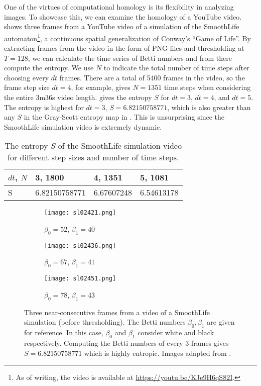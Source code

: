 One of the virtues of computational homology is its flexibility in analyzing images. To showcase this, we can examine the homology of a YouTube video.  shows three frames from a YouTube video of a simulation of the SmoothLife automaton\footnote{As of writing, the video is available at \url{https://youtu.be/KJe9H6qS82I}.}, a continuous spatial generalization of Conway's ``Game of Life''. By extracting frames from the video in the form of PNG files and thresholding at $T = 128$, we can calculate the time series of Betti numbers and from there compute the entropy. We use $N$ to indicate the total number of time steps after choosing every $dt$ frames. There are a total of 5400 frames in the video, so the frame step size $dt = 4$, for example, gives $N = 1351$ time steps when considering the entire 3m36s video length.  gives the entropy $S$ for $dt = 3$, $dt = 4$, and $dt = 5$. The entropy is highest for $dt = 3$, $S = 6.82150758771$, which is also greater than any $S$ in the Gray-Scott entropy map in . This is unsurprising since the SmoothLife simulation video is extremely dynamic.
%
\begin{table}
	\caption{The entropy $S$ of the SmoothLife simulation video for different step sizes and number of time steps.} \label{tab:smoothlife}
	\centering
	\renewcommand{\arraystretch}{1.5}
	\begin{tabular}{l | l l l }
	$dt$, $N$		& 3, 1800			& 4, 1351			& 5, 1081 \\
	\hline
	S			& 6.82150758771	& 6.67607248		& 6.54613178
	\end{tabular}
\end{table}%

\begin{figure}[h]
	\centering
	\begin{subfigure}[b]{0.3\textwidth}
		\texttt{[image: sl02421.png]}
		\caption{$\beta_0 = 52$, $\beta_1 = 40$} \label{fig:sl2421}
	\end{subfigure} \quad
	\begin{subfigure}[b]{0.3\textwidth}
		\texttt{[image: sl02436.png]}
		\caption{$\beta_0 = 67$, $\beta_1 = 41$} \label{fig:sl02436}
	\end{subfigure} \quad
	\begin{subfigure}[b]{0.3\textwidth}
		\texttt{[image: sl02451.png]}
		\caption{$\beta_0 = 78$, $\beta_1 = 43$} \label{fig:sl02451}
	\end{subfigure}
	\caption{Three near-consecutive frames from a video of a SmoothLife simulation (before thresholding). The Betti numbers $\beta_0, \beta_1$ are given for reference. In this case, $\beta_0$ and $\beta_1$ consider white and black respectively. Computing the Betti numbers of every 3 frames gives $S = 6.82150758771$ which is highly entropic. Images adapted from \protect{}.} \label{fig:smoothlife}
\end{figure}